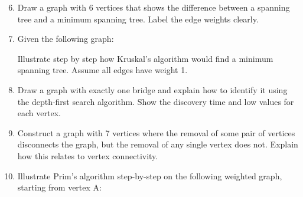 \documentclass{article}
\theoremstyle{definition}
\begin{document}
\begin{enumerate}\setcounter{enumi}{5}
\item Draw a graph with 6 vertices that shows the difference between a spanning tree and a minimum spanning tree. Label the edge weights clearly.

\item Given the following graph:
\begin{center}
\end{center}
Illustrate step by step how Kruskal's algorithm would find a minimum spanning tree. Assume all edges have weight 1.

\item Draw a graph with exactly one bridge and explain how to identify it using the depth-first search algorithm. Show the discovery time and low values for each vertex.

\item Construct a graph with 7 vertices where the removal of some pair of vertices disconnects the graph, but the removal of any single vertex does not. Explain how this relates to vertex connectivity.

\item Illustrate Prim's algorithm step-by-step on the following weighted graph, starting from vertex A:
\begin{center}
\end{center}
\end{enumerate}
\end{document}
